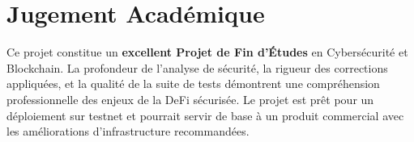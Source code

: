 \documentclass[12pt, a4paper]{report}
\begin{document}
\section{Jugement Acad\'{e}mique}
Ce projet constitue un \textbf{excellent Projet de Fin d'\'{E}tudes} en Cybers\'{e}curit\'{e} et Blockchain. La profondeur de l'analyse de s\'{e}curit\'{e}, la rigueur des corrections appliqu\'{e}es, et la qualit\'{e} de la suite de tests d\'{e}montrent une compr\'{e}hension professionnelle des enjeux de la DeFi s\'{e}curis\'{e}e. Le projet est pr\^{e}t pour un d\'{e}ploiement sur testnet et pourrait servir de base \`{a} un produit commercial avec les am\'{e}liorations d'infrastructure recommand\'{e}es.
\end{document}
